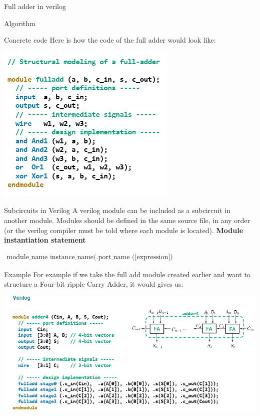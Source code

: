 \begin{parag}{Full adder in verilog}
\begin{subparag}{Algorithm}
         \end{subparag} 
     \begin{subparag}{Concrete code}
         Here is how the code of the full adder would look like:
         \begin{center}
             \includegraphics[scale=1]{62025-03-20.png}
         \end{center}
         
         
     \end{subparag} 
      \end{parag}
      \begin{parag}{Subcircuits in Verilog}
          A verilog module can be included as a subcircuit in another module. Modules should be defined in the same source file, in any order (or the verilog compiler must be told where each module is located).
     \textbf{Module instantiation statement } 
     \begin{center}
         \begin{align*}
             \text{module\_name instance\_name(.port\_name ([expression])\{,.port\_name(]expression])\});}
         \end{align*}
         
     \end{center}
    \begin{subparag}{Example}
        For example if we take the full add module created earlier and want to structure a Four-bit ripple Carry Adder, it would gives us:
        \begin{center}
            \includegraphics[scale=0.7]{72025-03-20.png}
            
        \end{center}
        
        
    \end{subparag} 
      \end{parag}
      
      
